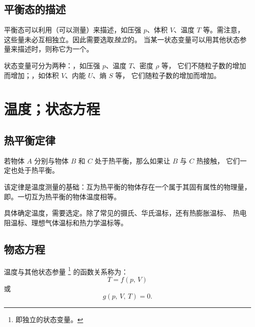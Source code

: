 \subsection{平衡态的描述} \label{subsec:平衡态的描述}

平衡态可以利用（可以测量）来描述，如压强 $p$、体积 $V$、温度 $T$
等。需注意，这些量未必互相独立。因此需要选取\emph{独立}的。
当某一状态变量可以用其他状态参量来描述时，则称它为一个。

状态变量可分为两种：，如压强 $p$、温度 $T$、密度 $\rho$ 等，
它们不随粒子数的增加而增加；，如体积 $V$、内能 $U$、熵 $S$ 等，
它们随粒子数的增加而增加。

\section{温度；状态方程}

\subsection{热平衡定律}

\begin{theorem}
  若物体 $A$ 分别与物体 $B$ 和 $C$ 处于热平衡，那么如果让 $B$ 与 $C$ 热接触，
  它们一定也处于热平衡。
\end{theorem}

该定律是温度测量的基础：互为热平衡的物体存在一个属于其固有属性的物理量，
即。一切互为热平衡的物体温度相等。

具体确定温度，需要选定。除了常见的摄氏、华氏温标，还有热膨胀温标、
热电阻温标、理想气体温标和热力学温标等。

\subsection{物态方程}

温度与其他状态参量 \footnote{即独立的状态变量。} 的函数关系称为：
\begin{equation}
  T = f(p, \, V)
\end{equation}
或
\begin{equation}
  g(p, \, V, \, T) = 0.
\end{equation}

